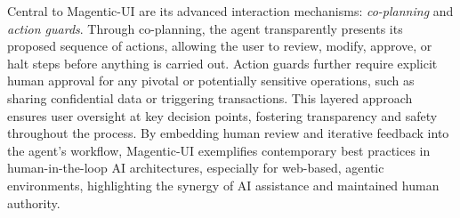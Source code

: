 Central to Magentic-UI are its advanced interaction mechanisms: \emph{co-planning} and \emph{action guards}. Through co-planning, the agent transparently presents its proposed sequence of actions, allowing the user to review, modify, approve, or halt steps before anything is carried out. Action guards further require explicit human approval for any pivotal or potentially sensitive operations, such as sharing confidential data or triggering transactions. This layered approach ensures user oversight at key decision points, fostering transparency and safety throughout the process. By embedding human review and iterative feedback into the agent's workflow, Magentic-UI exemplifies contemporary best practices in human-in-the-loop AI architectures, especially for web-based, agentic environments, highlighting the synergy of AI assistance and maintained human authority.
